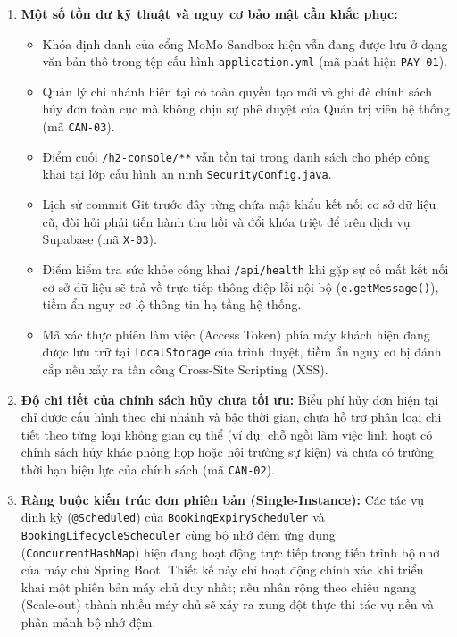 \begin{enumerate}
    \item \textbf{Một số tồn dư kỹ thuật và nguy cơ bảo mật cần khắc phục:}
    \begin{itemize}
        \item Khóa định danh của cổng MoMo Sandbox hiện vẫn đang được lưu ở dạng văn bản thô trong tệp cấu hình \texttt{application.yml} (mã phát hiện \texttt{PAY-01}).
        \item Quản lý chi nhánh hiện tại có toàn quyền tạo mới và ghi đè chính sách hủy đơn toàn cục mà không chịu sự phê duyệt của Quản trị viên hệ thống (mã \texttt{CAN-03}).
        \item Điểm cuối \texttt{/h2-console/**} vẫn tồn tại trong danh sách cho phép công khai tại lớp cấu hình an ninh \texttt{SecurityConfig.java}.
        \item Lịch sử commit Git trước đây từng chứa mật khẩu kết nối cơ sở dữ liệu cũ, đòi hỏi phải tiến hành thu hồi và đổi khóa triệt để trên dịch vụ Supabase (mã \texttt{X-03}).
        \item Điểm kiểm tra sức khỏe công khai \texttt{/api/health} khi gặp sự cố mất kết nối cơ sở dữ liệu sẽ trả về trực tiếp thông điệp lỗi nội bộ (\texttt{e.getMessage()}), tiềm ẩn nguy cơ lộ thông tin hạ tầng hệ thống.
        \item Mã xác thực phiên làm việc (Access Token) phía máy khách hiện đang được lưu trữ tại \texttt{localStorage} của trình duyệt, tiềm ẩn nguy cơ bị đánh cắp nếu xảy ra tấn công Cross-Site Scripting (XSS).
    \end{itemize}
    
    \item \textbf{Độ chi tiết của chính sách hủy chưa tối ưu:} Biểu phí hủy đơn hiện tại chỉ được cấu hình theo chi nhánh và bậc thời gian, chưa hỗ trợ phân loại chi tiết theo từng loại không gian cụ thể (ví dụ: chỗ ngồi làm việc linh hoạt có chính sách hủy khác phòng họp hoặc hội trường sự kiện) và chưa có trường thời hạn hiệu lực của chính sách (mã \texttt{CAN-02}).
    
    \item \textbf{Ràng buộc kiến trúc đơn phiên bản (Single-Instance):} Các tác vụ định kỳ (\texttt{@Scheduled}) của \texttt{BookingExpiryScheduler} và \texttt{BookingLifecycleScheduler} cùng bộ nhớ đệm ứng dụng (\texttt{ConcurrentHashMap}) hiện đang hoạt động trực tiếp trong tiến trình bộ nhớ của máy chủ Spring Boot. Thiết kế này chỉ hoạt động chính xác khi triển khai một phiên bản máy chủ duy nhất; nếu nhân rộng theo chiều ngang (Scale-out) thành nhiều máy chủ sẽ xảy ra xung đột thực thi tác vụ nền và phân mảnh bộ nhớ đệm.
    

\end{enumerate}
